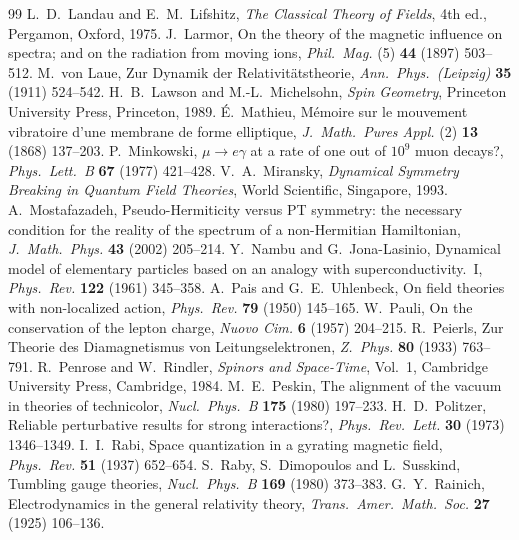 \begin{thebibliography}{99}
 L.~D.~Landau and E.~M.~Lifshitz, \emph{The Classical Theory of Fields}, 4th ed., Pergamon, Oxford, 1975.
 J.~Larmor, On the theory of the magnetic influence on spectra; and on the radiation from moving ions, \emph{Phil.\ Mag.} (5) \textbf{44} (1897) 503--512.
 M.~von Laue, Zur Dynamik der Relativit\"atstheorie, \emph{Ann.\ Phys.\ (Leipzig)} \textbf{35} (1911) 524--542.
 H.~B.~Lawson and M.-L.~Michelsohn, \emph{Spin Geometry}, Princeton University Press, Princeton, 1989.
 \'E.~Mathieu, M\'emoire sur le mouvement vibratoire d'une membrane de forme elliptique, \emph{J.\ Math.\ Pures Appl.} (2) \textbf{13} (1868) 137--203.
 P.~Minkowski, $\mu\to e\gamma$ at a rate of one out of $10^9$ muon decays?, \emph{Phys.\ Lett.\ B} \textbf{67} (1977) 421--428.
 V.~A.~Miransky, \emph{Dynamical Symmetry Breaking in Quantum Field Theories}, World Scientific, Singapore, 1993.
 A.~Mostafazadeh, Pseudo-Hermiticity versus PT symmetry: the necessary condition for the reality of the spectrum of a non-Hermitian Hamiltonian, \emph{J.\ Math.\ Phys.} \textbf{43} (2002) 205--214.
 Y.~Nambu and G.~Jona-Lasinio, Dynamical model of elementary particles based on an analogy with superconductivity.~I, \emph{Phys.\ Rev.} \textbf{122} (1961) 345--358.
 A.~Pais and G.~E.~Uhlenbeck, On field theories with non-localized action, \emph{Phys.\ Rev.} \textbf{79} (1950) 145--165.
 W.~Pauli, On the conservation of the lepton charge, \emph{Nuovo Cim.} \textbf{6} (1957) 204--215.
 R.~Peierls, Zur Theorie des Diamagnetismus von Leitungselektronen, \emph{Z.\ Phys.} \textbf{80} (1933) 763--791.
 R.~Penrose and W.~Rindler, \emph{Spinors and Space-Time}, Vol.~1, Cambridge University Press, Cambridge, 1984.
 M.~E.~Peskin, The alignment of the vacuum in theories of technicolor, \emph{Nucl.\ Phys.\ B} \textbf{175} (1980) 197--233.
 H.~D.~Politzer, Reliable perturbative results for strong interactions?, \emph{Phys.\ Rev.\ Lett.} \textbf{30} (1973) 1346--1349.
 I.~I.~Rabi, Space quantization in a gyrating magnetic field, \emph{Phys.\ Rev.} \textbf{51} (1937) 652--654.
 S.~Raby, S.~Dimopoulos and L.~Susskind, Tumbling gauge theories, \emph{Nucl.\ Phys.\ B} \textbf{169} (1980) 373--383.
 G.~Y.~Rainich, Electrodynamics in the general relativity theory, \emph{Trans.\ Amer.\ Math.\ Soc.} \textbf{27} (1925) 106--136.

\end{thebibliography}
